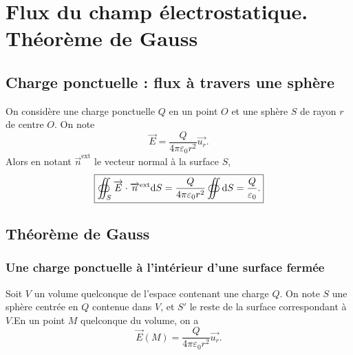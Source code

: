 \section[Flux du champ électrostatique]{Flux du champ électrostatique.\\Théorème de Gauss}

    \subsection{Charge ponctuelle : flux à travers une sphère}

        On considère une charge ponctuelle $Q$ en un point $O$ et une sphère $S$ de rayon $r$ de centre $O$. On note
        \begin{equation*}
            \vec{E}=\frac{Q}{4\pi\varepsilon_{0}r^{2}}\vec{u_r}.
        \end{equation*}
        Alors en notant $\vec{n}^{\text{ext}}$ le vecteur normal à la surface $S$,
        \begin{equation*}
            \boxed{
                \oiint_{S}\protect\overrightarrow{{E}}\cdot\protect\overrightarrow{{n}}^{\text{ext}}\mathrm{d} S=\frac{Q}{4\pi\varepsilon_{0}r^{2}}\oiint\mathrm{d} S=\frac{Q}{\varepsilon_{0}}.
            }
        \end{equation*}

    \subsection{Théorème de Gauss}
        \subsubsection{Une charge ponctuelle à l'intérieur d'une surface fermée}

            Soit $V$ un volume quelconque de l'espace contenant une charge $Q$. On note $S$ une sphère centrée en $Q$ contenue dans $V$, et $S'$ le reste de la surface correspondant à $V$.En un point $M$ quelconque du volume, on a
            \begin{equation*}
                \vec{E}(M)=\frac{Q}{4\pi\varepsilon_{0}r^{2}}\vec{u_r}.
            \end{equation*}

